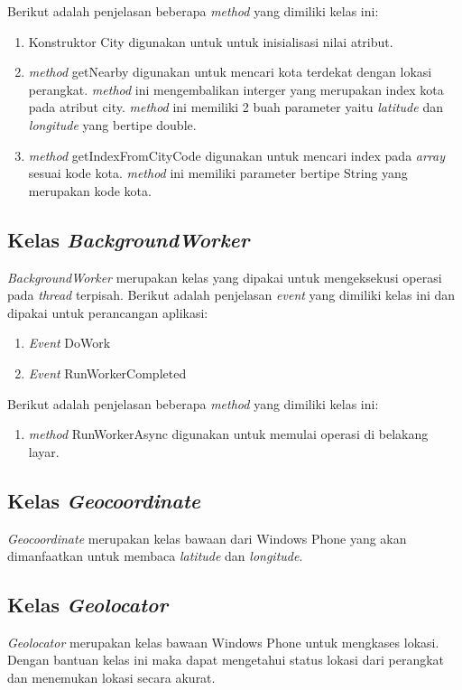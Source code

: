 Berikut adalah penjelasan beberapa \textit{method} yang dimiliki kelas ini:
\begin{enumerate}
	\item Konstruktor City digunakan untuk untuk inisialisasi nilai atribut.
	\item \textit{method} getNearby digunakan untuk mencari kota terdekat dengan lokasi perangkat. \textit{method} ini mengembalikan interger yang merupakan index kota pada atribut city. \textit{method} ini memiliki 2 buah parameter yaitu \textit{latitude} dan \textit{longitude} yang bertipe double.
	\item \textit{method} getIndexFromCityCode digunakan untuk mencari index pada \textit{array}  sesuai kode kota. \textit{method} ini memiliki parameter bertipe String yang merupakan kode kota.
\end{enumerate}

\subsection{Kelas \textit{BackgroundWorker}}
\label{lab:Kelas BackgroundWorker}
\hspace{0.5cm} \textit{BackgroundWorker} merupakan kelas yang dipakai untuk mengeksekusi operasi pada \textit{thread} terpisah. Berikut adalah penjelasan \textit{event} yang dimiliki kelas ini dan dipakai untuk perancangan aplikasi:
\begin{enumerate}
	\item \textit{Event} DoWork
	\item \textit{Event} RunWorkerCompleted
\end{enumerate}
Berikut adalah penjelasan beberapa \textit{method} yang dimiliki kelas ini:
\begin{enumerate}
	\item \textit{method} RunWorkerAsync digunakan untuk memulai operasi di belakang layar.
\end{enumerate}

\subsection{Kelas \textit{Geocoordinate}}
\label{lab:Kelas Geocoordinate}
\hspace{0.5cm} \textit{Geocoordinate} merupakan kelas bawaan dari Windows Phone yang akan dimanfaatkan untuk membaca \textit{latitude} dan \textit{longitude}.

\subsection{Kelas \textit{Geolocator}}
\label{lab:Kelas Geolocator}
\hspace{0.5cm} \textit{Geolocator} merupakan kelas bawaan Windows Phone untuk mengkases lokasi. Dengan bantuan kelas ini maka dapat mengetahui status lokasi dari perangkat dan menemukan lokasi secara akurat.

